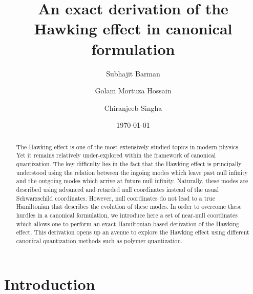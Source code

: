 \documentclass[aps,twocolumn,showpacs]{revtex4}
\begin{document}
\title{An exact derivation of the Hawking effect in canonical formulation}




\author{Subhajit Barman}


\author{Golam Mortuza Hossain}

\author{Chiranjeeb Singha}

 

\date{\today}

\begin{abstract}

The Hawking effect is one of the most extensively studied topics in modern 
physics. Yet it remains relatively under-explored within the framework of 
canonical quantization. The key difficulty lies in the fact that the Hawking 
effect is principally understood using the relation between the ingoing modes 
which leave past null infinity and the outgoing modes which arrive at future 
null infinity. Naturally, these modes are described using advanced and retarded 
null coordinates instead of the usual Schwarzschild coordinates. However, null 
coordinates do not lead to a true Hamiltonian that describes the evolution of 
these modes. In order to overcome these hurdles in a canonical formulation, we 
introduce here a set of near-null coordinates which allows one to perform an 
exact Hamiltonian-based derivation of the Hawking effect. This derivation opens 
up an avenue to explore the Hawking effect using different canonical 
quantization methods such as polymer quantization. 


\end{abstract}

\maketitle




\section{Introduction}
%
\end{document}
